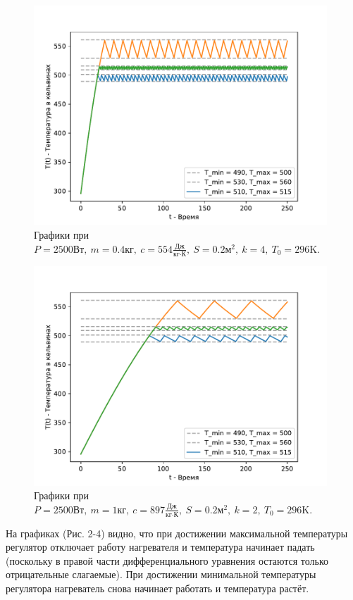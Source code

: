         \begin{figure}[H]
            \centering
            \includegraphics[width=11cm]{pictures/utug3.pdf}
            \caption{Графики при $P = 2500 \text{Вт}, ~ m = 0.4 \text{кг}, ~ c = 554 \frac{\text{Дж}}{\text{кг} \cdot \text{К}}, ~ S = 0.2 \text{м}^2, ~ k = 4, ~ T_0 = 296 \text{K}$.}
        \end{figure}


        \begin{figure}[H]
            \centering
            \includegraphics[width=11cm]{pictures/utug4.pdf}
            \caption{Графики при $P = 2500 \text{Вт}, ~ m = 1 \text{кг}, ~ c = 897 \frac{\text{Дж}}{\text{кг} \cdot \text{К}}, ~ S = 0.2 \text{м}^2, ~ k = 2, ~ T_0 = 296 \text{K}$.}
        \end{figure}

        На графиках (Рис. 2-4) видно, что при достижении максимальной температуры регулятор отключает работу нагревателя и температура начинает падать (поскольку в правой части дифференциального уравнения остаются только отрицательные слагаемые). При достижении минимальной температуры регулятора нагреватель снова начинает работать и температура растёт.


